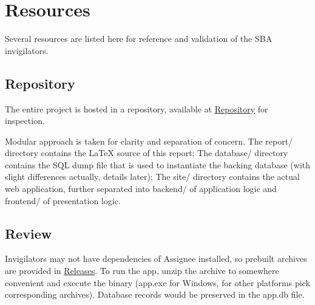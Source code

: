 \section{Resources}
\label{overview.src}

Several resources are listed here for reference and validation of the SBA
invigilators.

\subsection{Repository}
\label{overview.src.repo}

The entire project is hosted in a repository, available at
\href{https://github.com/CarbonicSoda/assignee}{Repository} for inspection.

Modular approach is taken for clarity and separation of concern. The report/
directory contains the \LaTeX{} source of this report; The database/ directory contains
the SQL dump file that is used to instantiate the backing database (with slight
differences actually, details later); The site/ directory contains the actual
web application, further separated into backend/ of application logic and
frontend/ of presentation logic.

\subsection{Review}
\label{overview.src.review}

Invigilators may not have dependencies of Assignee installed, so prebuilt archives
are provided in \href{https://github.com/CarbonicSoda/assignee/releases}{Releases}.
To run the app, unzip the archive to somewhere convenient and execute the binary
(app.exe for Windows, for other platforms pick corresponding archives). Database
records would be preserved in the app.db file.